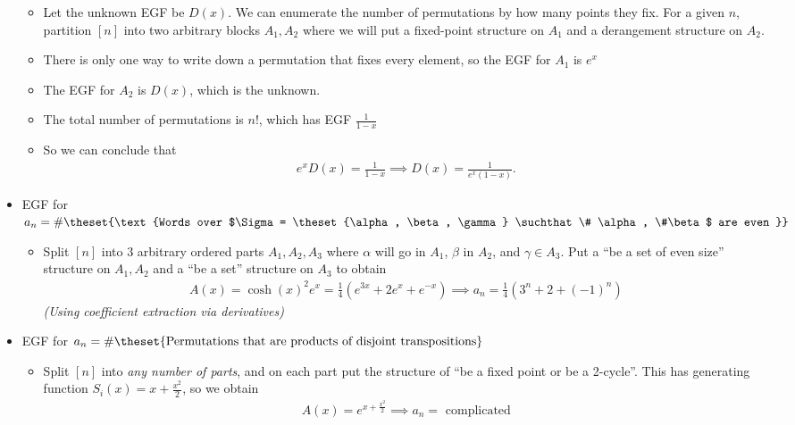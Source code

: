 \begin{itemize}
  \begin{itemize}
  \tightlist
  \item
    Let the unknown EGF be \(D(x)\). We can enumerate the number of
    permutations by how many points they fix. For a given \(n\),
    partition \([n]\) into two arbitrary blocks \(A_1, A_2\) where we
    will put a fixed-point structure on \(A_1\) and a derangement
    structure on \(A_2\).
  \item
    There is only one way to write down a permutation that fixes every
    element, so the EGF for \(A_1\) is \(e^x\)
  \item
    The EGF for \(A_2\) is \(D(x)\), which is the unknown.
  \item
    The total number of permutations is \(n!\), which has EGF
    \(\frac 1 {1-x}\)
  \item
    So we can conclude that
    \begin{align*}e^x D(x) = \frac{1}{1-x} \implies D(x) = \frac{1}{e^x(1-x)}.\end{align*}
  \end{itemize}
\item
  EGF for
  \(a_n = \#\theset{\text{Words over $\Sigma = \theset{\alpha, \beta, \gamma} \suchthat \# \alpha, \#\beta$ are even }}\)

  \begin{itemize}
  \tightlist
  \item
    Split \([n]\) into 3 arbitrary ordered parts \(A_1, A_2, A_3\) where
    \(\alpha\) will go in \(A_1\), \(\beta\) in \(A_2\), and
    \(\gamma \in A_3\). Put a ``be a set of even size'' structure on
    \(A_1, A_2\) and a ``be a set'' structure on \(A_3\) to obtain
    \begin{align*}
    A(x) = \cosh(x)^2 e^x = \frac{1}{4}(e^{3x} + 2e^x + e^{-x}) \implies a_n = \frac{1}{4}(3^n + 2 + (-1)^n)
    \end{align*} \emph{(Using coefficient extraction via derivatives)}
  \end{itemize}
\item
  EGF for
  \(a_n = \#\theset{\text{Permutations that are products of disjoint transpositions}}\)

  \begin{itemize}
  \tightlist
  \item
    Split \([n]\) into \emph{any number of parts}, and on each part put
    the structure of ``be a fixed point or be a 2-cycle''. This has
    generating function \(S_i(x) = x + \frac{x^2}{2}\), so we obtain
    \begin{align*}
    A(x) = e^{x + \frac{x^2}{2}} \implies a_n = \text{ complicated}
    \end{align*}
  \end{itemize}
\end{itemize}

